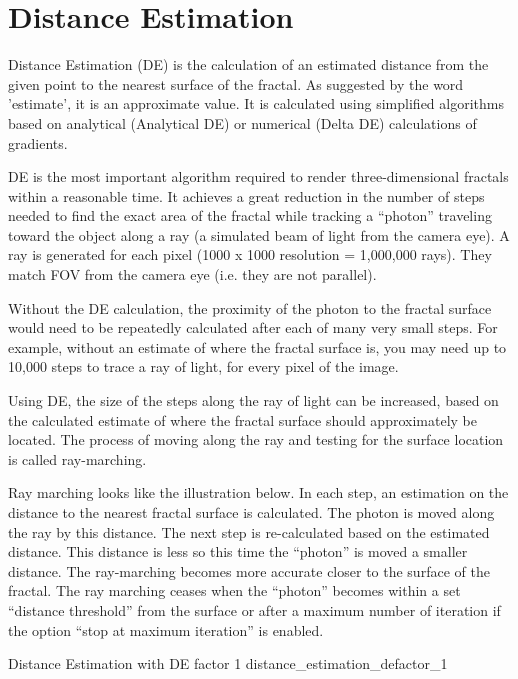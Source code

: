 \section{Distance Estimation}\label{distance-estimation}

Distance Estimation (DE) is the calculation of an estimated distance from the
given point to the nearest surface of the fractal. As suggested by the word
'estimate', it is an approximate value. It is calculated using simplified
algorithms based on analytical (Analytical DE) or numerical (Delta DE)
calculations of gradients.

DE is the most important algorithm required to render three-dimensional fractals
within a reasonable time. It achieves a great reduction in the number of steps
needed to find the exact area of the fractal while tracking a ``photon''
traveling toward the object along a ray (a simulated beam of light from the
camera eye). A ray is generated for each pixel (1000 x 1000 resolution =
1,000,000 rays). They match FOV from the camera eye (i.e. they are not
parallel).

Without the DE calculation, the proximity of the photon to the fractal surface
would need to be repeatedly calculated after each of many very small steps. For
example, without an estimate of where the fractal surface is, you may need up to
10,000 steps to trace a ray of light, for every pixel of the image.

Using DE, the size of the steps along the ray of light can be increased, based
on the calculated estimate of where the fractal surface should approximately be
located. The process of moving along the ray and testing for the surface
location is called ray-marching.

Ray marching looks like the illustration below. In each step, an estimation on
the distance to the nearest fractal surface is calculated. The photon is moved
along the ray by this distance. The next step is re-calculated based on the
estimated distance. This distance is less so this time the ``photon'' is moved a
smaller distance. The ray-marching becomes more accurate closer to the surface
of the fractal. The ray marching ceases when the ``photon'' becomes within a set
``distance threshold'' from the surface or after a maximum number of iteration
if the option ``stop at maximum iteration'' is enabled.

{Distance Estimation with DE factor 1}
{distance_estimation_defactor_1}

